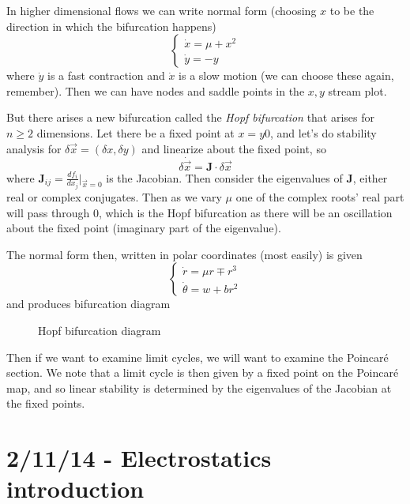 \documentclass[10pt]{report}
\newcommand{\rd}[2]{\frac{d#1}{d#2}}
\begin{document}
In higher dimensional flows we can write normal form (choosing $x$ to be the direction in which the bifurcation happens)
$$\begin{cases} \dot{x} = \mu + x^2\\ \dot{y} = -y\end{cases}$$
where $\dot{y}$ is a fast contraction and $\dot{x}$ is a slow motion (we can choose these again, remember). Then we can have nodes and saddle points in the $x,y$ stream plot. 

But there arises a new bifurcation called the \emph{Hopf bifurcation} that arises for $n \geq 2$ dimensions. Let there be a fixed point at $x = y 0 $, and let's do stability analysis for $\delta \vec{x} = (\delta x, \delta y)$ and linearize about the fixed point, so
$$\delta \dot{\vec{x}} = \mathbf{J}\cdot \delta \vec{x}$$
where $\mathbf{J}_{ij} = \rd{f_i}{x_j}\Big|_{\vec{x} = 0}$ is the Jacobian. Then consider the eigenvalues of $\mathbf{J}$, either real or complex conjugates. Then as we vary $\mu$ one of the complex roots' real part will pass through $0$, which is the Hopf bifurcation as there will be an oscillation about the fixed point (imaginary part of the eigenvalue).

The normal form then, written in polar coordinates (most easily) is given
$$\begin{cases} \dot{r} = \mu r \mp r^3 \\ \dot{\theta} = w + br^2\end{cases}$$
and produces bifurcation diagram
\begin{figure}[!h]
    \centering
    \caption{Hopf bifurcation diagram}
\end{figure}

Then if we want to examine limit cycles, we will want to examine the Poincar\'e section. We note that a limit cycle is then given by a fixed point on the Poincar\'e map, and so linear stability is determined by the eigenvalues of the Jacobian at the fixed points. 

\chapter{2/11/14 - Electrostatics introduction}
\end{document}
